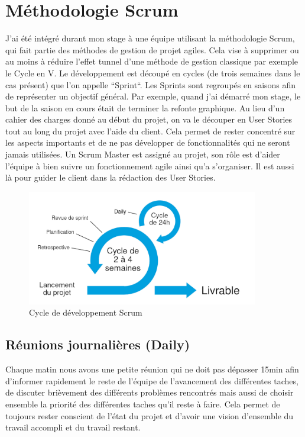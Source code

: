 \documentclass[12pt, a4paper]{report}
\begin{document}
    \section{Méthodologie Scrum}
        J'ai été intégré durant mon stage à une équipe utilisant la méthodologie Scrum, qui fait partie des méthodes de gestion de projet agiles. Cela vise à supprimer ou au moins à réduire l'effet tunnel d'une méthode de gestion classique par exemple le Cycle en V.\newline
        Le développement est découpé en cycles (de trois semaines dans le cas présent) que l'on appelle ``Sprint``.\newline
        Les Sprints sont regroupés en saisons afin de représenter un objectif général.
        Par exemple, quand j'ai démarré mon stage, le but de la saison en cours était de terminer la refonte graphique.
        Au lieu d'un cahier des charges donné au début du projet, on va le découper en User Stories tout au long du projet avec l'aide du client.\newline
        Cela permet de rester concentré sur les aspects importants et de ne pas développer de fonctionnalités qui ne seront jamais utilisées.\newline
        Un Scrum Master est assigné au projet, son rôle est d'aider l'équipe à bien suivre un fonctionnement agile ainsi qu'a s'organiser. Il est aussi là pour guider le client dans la rédaction des User Stories.
        \begin{figure}[H]
            \begin{center}
                \includegraphics[width=0.9\textwidth]{scrum.jpg}
            \end{center}
            \caption{Cycle de développement Scrum}
        \end{figure}
        \subsection{Réunions journalières (Daily)}
            Chaque matin nous avons une petite réunion qui ne doit pas dépasser 15min afin d'informer rapidement le reste de l'équipe de l'avancement des différentes taches, de discuter brièvement des différents problèmes rencontrés mais aussi de choisir ensemble la priorité des différentes taches qu'il reste à faire.\newline
            Cela permet de toujours rester conscient de l'état du projet et d'avoir une vision d'ensemble du travail accompli et du travail restant.
\end{document}
